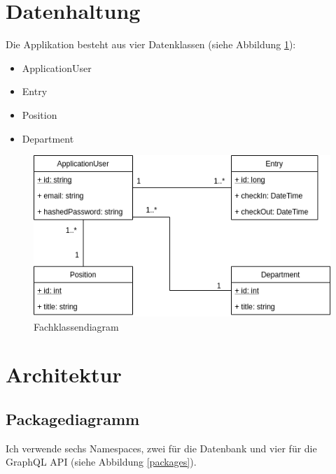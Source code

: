 \documentclass[a4paper, titlepage]{article}
\begin{document}
    \section{Datenhaltung}
    Die Applikation besteht aus vier Datenklassen (siehe Abbildung \ref{fachklassen}):
    \begin{itemize}
        \item ApplicationUser
        \item Entry
        \item Position
        \item Department
    \end{itemize}

    \begin{figure}
        \includegraphics[width=\textwidth]{images/Fachklassendiagramm.png}
        \caption{Fachklassendiagram}
        \label{fachklassen}
    \end{figure}

    \section{Architektur}
    \subsection{Packagediagramm}
    Ich verwende sechs Namespaces, zwei für die Datenbank und vier für die
    GraphQL API (siehe Abbildung \ref{packages}).
\end{document}
